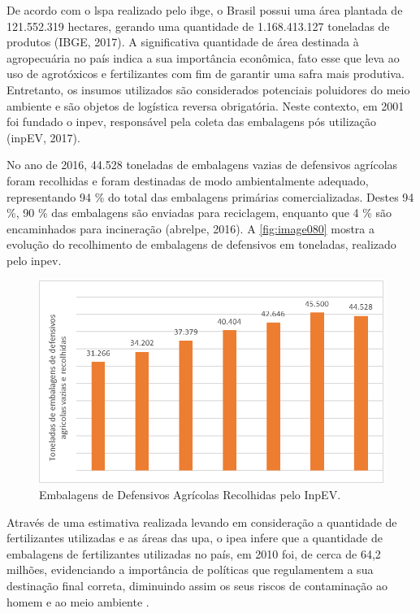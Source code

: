 De acordo com o \gls{lspa} realizado pelo \gls{ibge}, o Brasil possui uma área plantada de 121.552.319 hectares, gerando uma quantidade de 1.168.413.127 toneladas de produtos (IBGE, 2017). A significativa quantidade de área destinada à agropecuária no país indica a sua importância econômica, fato esse que leva ao uso de agrotóxicos e fertilizantes com fim de garantir uma safra mais produtiva. Entretanto, os insumos utilizados são considerados potenciais poluidores do meio ambiente e são objetos de logística reversa obrigatória. Neste contexto, em 2001 foi fundado o \gls{inpev}, responsável pela coleta das embalagens pós utilização (inpEV, 2017).

No ano de 2016, 44.528 toneladas de embalagens vazias de defensivos agrícolas foram recolhidas e foram destinadas de modo ambientalmente adequado, representando 94 \% do total das embalagens primárias comercializadas. Destes 94 \%, 90 \% das embalagens são enviadas para reciclagem, enquanto que 4 \% são encaminhados para incineração (\gls{abrelpe}, 2016). A \autoref{fig:image080} mostra a evolução do recolhimento de embalagens de defensivos em toneladas, realizado pelo \gls{inpev}.

\begin{figure}
	\centering
	\includegraphics[width=0.75\linewidth]{produtos/prodtres/image080}
	\caption{Embalagens de Defensivos Agrícolas Recolhidas pelo InpEV.}
	\label{fig:image080}
\end{figure}


Através de uma estimativa realizada levando em consideração a quantidade de fertilizantes utilizadas e as áreas das \gls{upa}, o \gls{ipea} infere que a quantidade de embalagens de fertilizantes utilizadas no país, em 2010 foi, de cerca de 64,2 milhões, evidenciando a importância de políticas que regulamentem a sua destinação final correta, diminuindo assim os seus riscos de contaminação ao homem e ao meio ambiente \cite{IPEA2013}.

